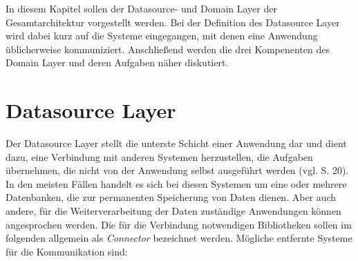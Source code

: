 \label{chap:datasourcelayer}
In diesem Kapitel sollen der Datasource- und Domain Layer der Gesamtarchitektur
vorgestellt werden. Bei der Definition des Datasource Layer wird dabei kurz auf
die Systeme eingegangen, mit denen eine Anwendung üblicherweise kommuniziert.
Anschließend werden die drei Kompenenten des Domain Layer und deren Aufgaben
näher diskutiert.

\section{Datasource Layer}\label{sec:datasource}
Der Datasource Layer stellt die unterste Schicht einer Anwendung dar und dient
dazu, eine Verbindung mit anderen Systemen herzustellen, die Aufgaben
übernehmen, die nicht von der Anwendung selbst ausgeführt werden (vgl.
\cite{fowler:2002} S. 20). In den meisten Fällen handelt es sich bei diesen Systemen um eine oder
mehrere Datenbanken, die zur permanenten Speicherung von Daten dienen. Aber auch
andere, für die Weiterverarbeitung der Daten zuständige Anwendungen können
angesprochen werden. Die für die Verbindung notwendigen Bibliotheken sollen im
folgenden allgemein als \emph{Connector} bezeichnet werden. Mögliche entfernte
Systeme für die Kommunikation sind:


